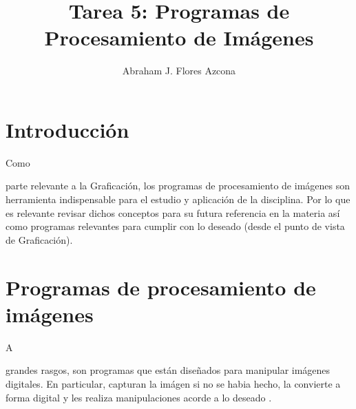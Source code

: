 \documentclass[stu, 12pt, letterpaper, donotrepeattitle, floatsintext, natbib]{apa7}
\title{\Large Tarea 5: Programas de Procesamiento de Imágenes}
\author{Abraham J. Flores Azcona} %
\affiliation{Instituto Tecnológico de Tijuana}
\begin{document}
    \maketitle

    \renewcommand\contentsname{Contenido}
    \tableofcontents

    \newpage
    \section*{Introducción}
    Como \begin{justifying}
    parte relevante a la Graficación, los programas de procesamiento de imágenes son herramienta indispensable para el estudio y aplicación de la disciplina.
    Por lo que es relevante revisar dichos conceptos para su futura referencia en la materia así como programas relevantes para cumplir con lo deseado (desde
    el punto de vista de Graficación).\par  
    \end{justifying}
    \section{Programas de procesamiento de imágenes}
    A \begin{justifying}
        grandes rasgos, son programas que están diseñados para manipular imágenes digitales. En particular, capturan la imágen si no se habia hecho,
    la convierte a forma digital y les realiza manipulaciones acorde a lo deseado \citep{gloog-no-date}.
    \par
    \end{justifying}
\end{document}
